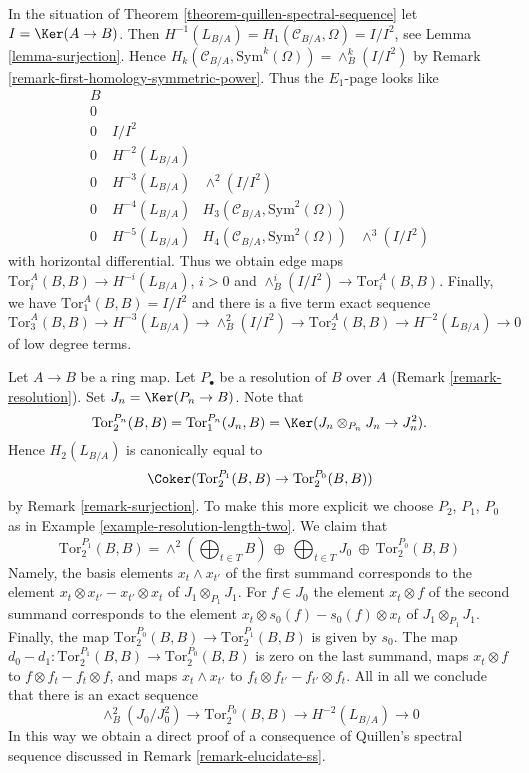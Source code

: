 \begin{remark}
\label{remark-elucidate-ss}
In the situation of Theorem \ref{theorem-quillen-spectral-sequence}
let $I = \Ker(A \to B)$. Then
$H^{-1}(L_{B/A}) = H_1(\mathcal{C}_{B/A}, \Omega) = I/I^2$, see
Lemma \ref{lemma-surjection}.
Hence $H_k(\mathcal{C}_{B/A}, \text{Sym}^k(\Omega)) = \wedge^k_B(I/I^2)$ by
Remark \ref{remark-first-homology-symmetric-power}. Thus the
$E_1$-page looks like
$$
\begin{matrix}
B \\
0 \\
0 & I/I^2 \\
0 & H^{-2}(L_{B/A}) \\
0 & H^{-3}(L_{B/A}) & \wedge^2(I/I^2) \\
0 & H^{-4}(L_{B/A}) & H_3(\mathcal{C}_{B/A}, \text{Sym}^2(\Omega)) \\
0 & H^{-5}(L_{B/A}) & H_4(\mathcal{C}_{B/A}, \text{Sym}^2(\Omega)) &
\wedge^3(I/I^2)
\end{matrix}
$$
with horizontal differential. Thus we obtain edge maps
$\text{Tor}_i^A(B, B) \to H^{-i}(L_{B/A})$, $i > 0$ and
$\wedge^i_B(I/I^2) \to \text{Tor}_i^A(B, B)$. Finally, we have
$\text{Tor}_1^A(B, B) = I/I^2$ and there is a
five term exact sequence
$$
\text{Tor}_3^A(B, B) \to H^{-3}(L_{B/A}) \to \wedge^2_B(I/I^2) \to
\text{Tor}_2^A(B, B) \to H^{-2}(L_{B/A}) \to 0
$$
of low degree terms.
\end{remark}

\begin{remark}
\label{remark-elucidate-degree-two}
Let $A \to B$ be a ring map. Let $P_\bullet$ be a resolution of
$B$ over $A$ (Remark \ref{remark-resolution}).
Set $J_n = \Ker(P_n \to B)$. Note that
$$
\text{Tor}_2^{P_n}(B, B) = 
\text{Tor}_1^{P_n}(J_n, B) =
\Ker(J_n \otimes_{P_n} J_n \to J_n^2).
$$
Hence $H_2(L_{B/A})$ is canonically equal to
$$
\Coker(\text{Tor}_2^{P_1}(B, B) \to \text{Tor}_2^{P_0}(B, B))
$$
by Remark \ref{remark-surjection}. To make this more explicit we choose
$P_2$, $P_1$, $P_0$ as in Example \ref{example-resolution-length-two}.
We claim that
$$
\text{Tor}_2^{P_1}(B, B) =
\wedge^2(\bigoplus\nolimits_{t \in T} B)\ \oplus
\ \bigoplus\nolimits_{t \in T} J_0\ \oplus
\ \text{Tor}_2^{P_0}(B, B)
$$
Namely, the basis elements $x_t \wedge x_{t'}$ of the first summand
corresponds to the element $x_t \otimes x_{t'} - x_{t'} \otimes x_t$
of $J_1 \otimes_{P_1} J_1$. For $f \in J_0$ the element $x_t \otimes f$
of the second summand corresponds to the element
$x_t \otimes s_0(f) - s_0(f) \otimes x_t$ of $J_1 \otimes_{P_1} J_1$.
Finally, the map $\text{Tor}_2^{P_0}(B, B) \to \text{Tor}_2^{P_1}(B, B)$
is given by $s_0$. The map
$d_0 - d_1 : \text{Tor}_2^{P_1}(B, B) \to \text{Tor}_2^{P_0}(B, B)$
is zero on the last summand, maps $x_t \otimes f$ to
$f \otimes f_t - f_t \otimes f$, and maps $x_t \wedge x_{t'}$
to $f_t \otimes f_{t'} - f_{t'} \otimes f_t$. All in all we conclude
that there is an exact sequence
$$
\wedge^2_B(J_0/J_0^2) \to \text{Tor}_2^{P_0}(B, B) \to H^{-2}(L_{B/A}) \to 0
$$
In this way we obtain a direct proof of a consequence of Quillen's spectral
sequence discussed in Remark \ref{remark-elucidate-ss}.
\end{remark}






